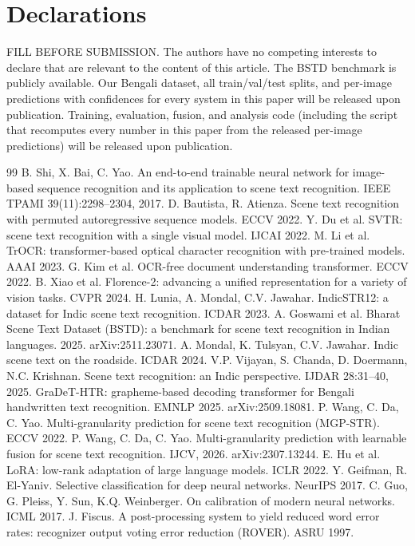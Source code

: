 \documentclass[iicol,pdflatex,sn-mathphys-num]{sn-jnl}
\begin{document}
\section*{Declarations}
FILL BEFORE SUBMISSION.
 The authors have no competing interests to
declare that are relevant to the content of this article.
 The BSTD benchmark is publicly available. Our
Bengali dataset, all train/val/test splits, and per-image predictions with
confidences for every system in this paper will be released upon
publication.
 Training, evaluation, fusion, and analysis code
(including the script that recomputes every number in this paper from the
released per-image predictions) will be released upon publication.

\begin{thebibliography}{99}\small
{} B. Shi, X. Bai, C. Yao. An end-to-end trainable neural
network for image-based sequence recognition and its application to scene
text recognition. IEEE TPAMI 39(11):2298--2304, 2017.
 D. Bautista, R. Atienza. Scene text recognition with
permuted autoregressive sequence models. ECCV 2022.
 Y. Du et al. SVTR: scene text recognition with a single
visual model. IJCAI 2022.
 M. Li et al. TrOCR: transformer-based optical character
recognition with pre-trained models. AAAI 2023.
 G. Kim et al. OCR-free document understanding transformer.
ECCV 2022.
 B. Xiao et al. Florence-2: advancing a unified
representation for a variety of vision tasks. CVPR 2024.
 H. Lunia, A. Mondal, C.V. Jawahar. IndicSTR12: a
dataset for Indic scene text recognition. ICDAR 2023.
 A. Goswami et al. Bharat Scene Text Dataset (BSTD): a
benchmark for scene text recognition in Indian languages. 2025.
arXiv:2511.23071.
 A. Mondal, K. Tulsyan, C.V. Jawahar. Indic scene text
on the roadside. ICDAR 2024.
 V.P. Vijayan, S. Chanda, D. Doermann, N.C. Krishnan.
Scene text recognition: an Indic perspective. IJDAR 28:31--40, 2025.
 GraDeT-HTR: grapheme-based decoding transformer for Bengali
handwritten text recognition. EMNLP 2025. arXiv:2509.18081.
 P. Wang, C. Da, C. Yao. Multi-granularity prediction for
scene text recognition (MGP-STR). ECCV 2022.
 P. Wang, C. Da, C. Yao. Multi-granularity prediction with
learnable fusion for scene text recognition. IJCV, 2026. arXiv:2307.13244.
 E. Hu et al. LoRA: low-rank adaptation of large language
models. ICLR 2022.
 Y. Geifman, R. El-Yaniv. Selective classification for
deep neural networks. NeurIPS 2017.
 C. Guo, G. Pleiss, Y. Sun, K.Q. Weinberger. On calibration
of modern neural networks. ICML 2017.
 J. Fiscus. A post-processing system to yield reduced word
error rates: recognizer output voting error reduction (ROVER). ASRU 1997.
\end{thebibliography}
\end{document}
